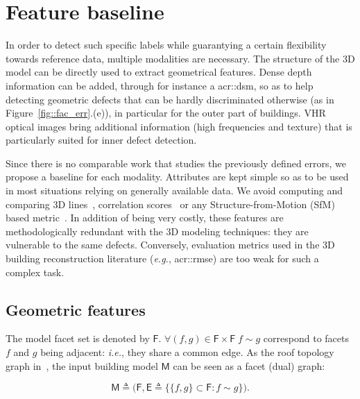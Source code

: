 \minitoc

\vfill

\clearpage

\section{Feature baseline}
    In order to detect such specific labels while guarantying a certain flexibility towards reference data, multiple modalities are necessary.
    The structure of the 3D model can be directly used to extract geometrical features.
    Dense depth information can be added, through for instance a \gls{acr::dsm}, so as to help detecting geometric defects that can be hardly discriminated otherwise (as in Figure~\ref{fig::fac_err}.(e)), in particular for the outer part of buildings. VHR optical images bring additional information (high frequencies and texture) that is particularly suited for inner defect detection.

    Since there is no comparable work that studies the previously defined errors, we propose a baseline for each modality.
    Attributes are kept simple so as to be used in most situations relying on generally available data. We avoid computing and comparing 3D lines~\parencite{michelin2013quality}, correlation scores~\parencite{boudet2006supervised} or any Structure-from-Motion (SfM) based metric~\parencite{kowdle2011active}.
    In addition of being very costly, these features are methodologically redundant with the 3D modeling techniques: they are vulnerable to the same defects.
    Conversely, evaluation metrics used in the 3D building reconstruction literature (\textit{e.g.}, \gls{acr::rmse}) are too weak for such a complex task.

    \subsection{Geometric features}
        The model facet set is denoted by $\mathsf{F}$.
        $\forall (f, g) \in \mathsf{F} \times \mathsf{F} \; f \sim g$ correspond to facets $f$ and $g$ being adjacent:
        \textit{i.e.}, they share a common edge. As the roof topology graph in~\parencite{verma20063d}, the input building model $\mathsf{M}$ can be seen as a facet (dual) graph:

        \begin{equation}
        	\label{eq::model_graph}
        	\mathsf{M} \triangleq \Big(\mathsf{F}, \mathsf{E} \triangleq \big\{ \{f, g\} \subset \mathsf{F} : f \sim g \big\} \Big).
        \end{equation}

